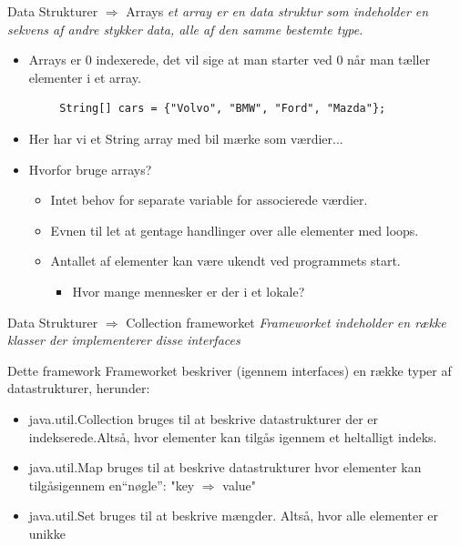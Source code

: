 \documentclass[10pt,aspectratio=1610]{beamer}
\begin{document}
\begin{frame}[fragile]{Data Strukturer $\Rightarrow$ Arrays}
\textit{et array er en data struktur som indeholder en sekvens af andre stykker data, alle af den samme bestemte type.}
    \begin{itemize}
        \item Arrays er 0 indexerede, det vil sige at man starter ved 0 når man tæller elementer i et array.
    \end{itemize}
    \begin{lstlisting}
        String[] cars = {"Volvo", "BMW", "Ford", "Mazda"};
    \end{lstlisting}
    \begin{itemize}
        \item Her har vi et String array med bil mærke som værdier... 
    \end{itemize}
    \begin{itemize}
        \item Hvorfor bruge arrays?
        \begin{itemize}
            \item Intet behov for separate variable for associerede værdier.
            \item Evnen til let at gentage handlinger over alle elementer med loops.
            \item Antallet af elementer kan være ukendt ved programmets start.
            \begin{itemize}
                \item Hvor mange mennesker er der i et lokale?
            \end{itemize}
        \end{itemize}
    \end{itemize}
\end{frame}

\begin{frame}[fragile]{Data Strukturer $\Rightarrow$ Collection frameworket}
    \textit{Frameworket indeholder en række klasser der implementerer disse interfaces}

    Dette framework Frameworket beskriver (igennem interfaces) en række typer af datastrukturer, herunder:

    \begin{itemize}
        \item \alert{java.util.Collection} bruges til at beskrive datastrukturer der er indekserede.Altså, hvor elementer kan tilgås igennem et heltalligt indeks.
        \item \alert{java.util.Map} bruges til at beskrive datastrukturer hvor elementer kan tilgåsigennem en“nøgle”: "key $\Rightarrow$ value"
        \item \alert{java.util.Set} bruges til at beskrive mængder. Altså, hvor alle elementer er unikke
    \end{itemize}
\end{frame}
\end{document}
